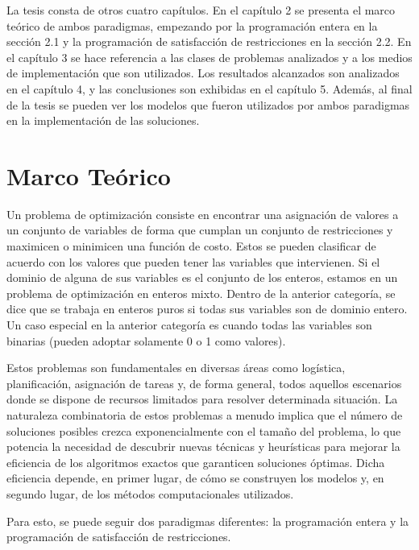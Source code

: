 \documentclass[12pt]{report}
\begin{document}
La tesis consta de otros cuatro capítulos. En el capítulo 2 se presenta el marco teórico de ambos paradigmas, empezando por la programación entera en la sección 2.1 y la programación de satisfacción de restricciones en la sección 2.2. En el capítulo 3 se hace referencia a las clases de problemas analizados y a los medios de implementación que son utilizados. Los resultados alcanzados son analizados en el capítulo 4, y las conclusiones son exhibidas en el capítulo 5. Además, al final de la tesis se pueden ver los modelos que fueron utilizados por ambos paradigmas en la implementación de las soluciones.\\


\chapter{Marco Teórico}

Un problema de optimización consiste en encontrar una asignación de valores a un conjunto de variables de forma que cumplan un conjunto de restricciones y maximicen o minimicen una función de costo. Estos se pueden clasificar de acuerdo con los valores que pueden tener las variables que intervienen. Si el dominio de alguna de sus variables es el conjunto de los enteros, estamos en un problema de optimización en enteros mixto. Dentro de la anterior categoría, se dice que se trabaja en enteros puros si todas sus variables son de dominio entero. Un caso especial en la anterior categoría es cuando todas las variables son binarias (pueden adoptar solamente 0 o 1 como valores).

Estos problemas son fundamentales en diversas áreas como logística, planificación, asignación de tareas y, de forma general, todos aquellos escenarios donde se dispone de recursos limitados para resolver determinada situación. La naturaleza combinatoria de estos problemas a menudo implica que el número de soluciones posibles crezca exponencialmente con el tamaño del problema, lo que potencia la necesidad de descubrir nuevas técnicas y heurísticas para mejorar la eficiencia de los algoritmos exactos que garanticen soluciones óptimas. Dicha eficiencia depende, en primer lugar, de cómo se construyen los modelos y, en segundo lugar, de los métodos computacionales utilizados. 

Para esto, se puede seguir dos paradigmas diferentes: la programación entera y la programación de satisfacción de restricciones.
\end{document}
